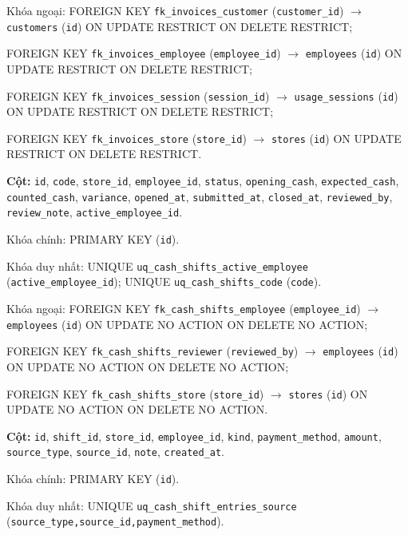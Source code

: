 \begin{description}[leftmargin=3.6cm,labelwidth=3.4cm,style=nextline]
Khóa ngoại: FOREIGN KEY \texttt{fk\_invoices\_customer} (\texttt{customer\_id}) $\rightarrow$ \texttt{customers} (\texttt{id}) ON UPDATE RESTRICT ON DELETE RESTRICT;\par FOREIGN KEY \texttt{fk\_invoices\_employee} (\texttt{employee\_id}) $\rightarrow$ \texttt{employees} (\texttt{id}) ON UPDATE RESTRICT ON DELETE RESTRICT;\par FOREIGN KEY \texttt{fk\_invoices\_session} (\texttt{session\_id}) $\rightarrow$ \texttt{usage\_sessions} (\texttt{id}) ON UPDATE RESTRICT ON DELETE RESTRICT;\par FOREIGN KEY \texttt{fk\_invoices\_store} (\texttt{store\_id}) $\rightarrow$ \texttt{stores} (\texttt{id}) ON UPDATE RESTRICT ON DELETE RESTRICT.

\item[\texttt{cash\_shifts}] \textbf{Cột:} \texttt{id}, \texttt{code}, \texttt{store\_id}, \texttt{employee\_id}, \texttt{status}, \texttt{opening\_cash}, \texttt{expected\_cash}, \texttt{counted\_cash}, \texttt{variance}, \texttt{opened\_at}, \texttt{submitted\_at}, \texttt{closed\_at}, \texttt{reviewed\_by}, \texttt{review\_note}, \texttt{active\_employee\_id}.

Khóa chính: PRIMARY KEY (\texttt{id}).

Khóa duy nhất: UNIQUE \texttt{uq\_cash\_shifts\_active\_employee} (\texttt{active\_employee\_id}); UNIQUE \texttt{uq\_cash\_shifts\_code} (\texttt{code}).

Khóa ngoại: FOREIGN KEY \texttt{fk\_cash\_shifts\_employee} (\texttt{employee\_id}) $\rightarrow$ \texttt{employees} (\texttt{id}) ON UPDATE NO ACTION ON DELETE NO ACTION;\par FOREIGN KEY \texttt{fk\_cash\_shifts\_reviewer} (\texttt{reviewed\_by}) $\rightarrow$ \texttt{employees} (\texttt{id}) ON UPDATE NO ACTION ON DELETE NO ACTION;\par FOREIGN KEY \texttt{fk\_cash\_shifts\_store} (\texttt{store\_id}) $\rightarrow$ \texttt{stores} (\texttt{id}) ON UPDATE NO ACTION ON DELETE NO ACTION.

\item[\texttt{cash\_shift\_entries}] \textbf{Cột:} \texttt{id}, \texttt{shift\_id}, \texttt{store\_id}, \texttt{employee\_id}, \texttt{kind}, \texttt{payment\_method}, \texttt{amount}, \texttt{source\_type}, \texttt{source\_id}, \texttt{note}, \texttt{created\_at}.

Khóa chính: PRIMARY KEY (\texttt{id}).

Khóa duy nhất: UNIQUE \texttt{uq\_cash\_shift\_entries\_source} (\texttt{source\_type,source\_id,payment\_method}).


\end{description}
